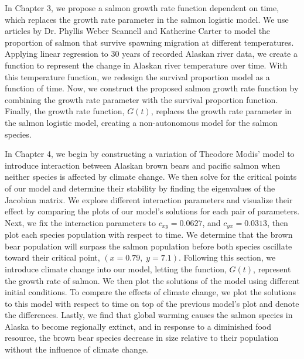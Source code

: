 In Chapter 3, we propose a salmon growth rate function dependent on time, which replaces the growth rate parameter in the salmon logistic model.
We use articles by Dr. Phyllis Weber Scannell and Katherine Carter to model the proportion of salmon that survive spawning migration at different temperatures.
Applying linear regression to 30 years of recorded Alaskan river data, we create a function to represent the change in Alaskan river temperature over time.
With this temperature function, we redesign the survival proportion model as a function of time.
Now, we construct the proposed salmon growth rate function by combining the growth rate parameter with the survival proportion function.
Finally, the growth rate function, $G(t)$, replaces the growth rate parameter in the salmon logistic model, creating a non-autonomous model for the salmon species.



In Chapter 4, we begin by constructing a variation of Theodore Modis' model to introduce interaction between Alaskan brown bears and pacific salmon when neither species is affected by climate change.
We then solve for the critical points of our model and determine their stability by finding the eigenvalues of the Jacobian matrix.
We explore different interaction parameters and visualize their effect by comparing the plots of our model's solutions for each pair of parameters.
Next, we fix the interaction parameters to $c_{xy} = 0.0627$, and $c_{yx} = 0.0313$, then plot each species population with respect to time.
We determine that the brown bear population will surpass the salmon population before both species oscillate toward their critical point, $(x=0.79,\;y=7.1)$.
Following this section, we introduce climate change into our model, letting the function, $G(t)$, represent the growth rate of salmon.
We then plot the solutions of the model using different initial conditions.
To compare the effects of climate change, we plot the solutions to this model with respect to time on top of the previous model's plot and denote the differences.
Lastly, we find that global warming causes the salmon species in Alaska to become regionally extinct, and in response to a diminished food resource, the brown bear species decrease in size relative to their population without the influence of climate change.

